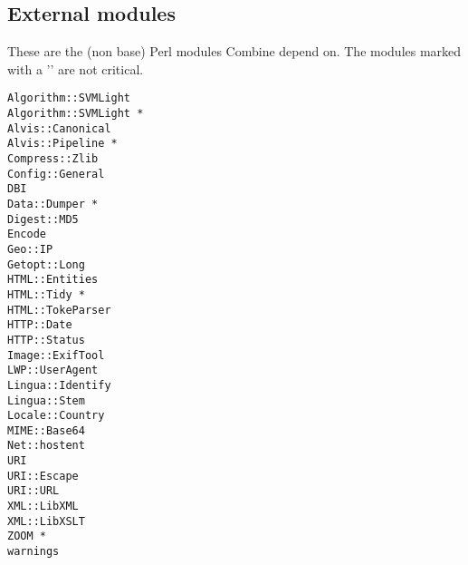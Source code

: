 \subsection{External modules}
\label{extmods}
These are the (non base) Perl modules Combine depend on.
The modules marked with a '{\tt *}' are not critical.
\begin{verbatim}
Algorithm::SVMLight
Algorithm::SVMLight *
Alvis::Canonical
Alvis::Pipeline *
Compress::Zlib
Config::General
DBI
Data::Dumper *
Digest::MD5
Encode
Geo::IP
Getopt::Long
HTML::Entities
HTML::Tidy *
HTML::TokeParser
HTTP::Date
HTTP::Status
Image::ExifTool
LWP::UserAgent
Lingua::Identify
Lingua::Stem
Locale::Country
MIME::Base64
Net::hostent
URI
URI::Escape
URI::URL
XML::LibXML
XML::LibXSLT
ZOOM *
warnings
\end{verbatim}
